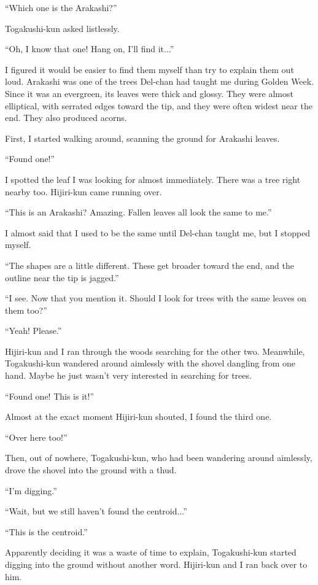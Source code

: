 \documentclass[
    a4paper,
    12pt,
    twoside,
    openany,
    UTF8,
    fontset=windows
]{ctexbook}
\begin{document}
``Which one is the Arakashi?''

Togakushi-kun asked listlessly.

``Oh, I know that one! Hang on, I'll find it...''

I figured it would be easier to find them myself than try to explain them out loud. Arakashi was one of the trees Del-chan had taught me during Golden Week. Since it was an evergreen, its leaves were thick and glossy. They were almost elliptical, with serrated edges toward the tip, and they were often widest near the end. They also produced acorns.

First, I started walking around, scanning the ground for Arakashi leaves.

``Found one!''

I spotted the leaf I was looking for almost immediately. There was a tree right nearby too. Hijiri-kun came running over.

``This is an Arakashi? Amazing. Fallen leaves all look the same to me.''

I almost said that I used to be the same until Del-chan taught me, but I stopped myself.

``The shapes are a little different. These get broader toward the end, and the outline near the tip is jagged.''

``I see. Now that you mention it. Should I look for trees with the same leaves on them too?''

``Yeah! Please.''

Hijiri-kun and I ran through the woods searching for the other two. Meanwhile, Togakushi-kun wandered around aimlessly with the shovel dangling from one hand. Maybe he just wasn't very interested in searching for trees.

``Found one! This is it!''

Almost at the exact moment Hijiri-kun shouted, I found the third one.

``Over here too!''

Then, out of nowhere, Togakushi-kun, who had been wandering around aimlessly, drove the shovel into the ground with a thud.

``I'm digging.''

``Wait, but we still haven't found the centroid...''

``This is the centroid.''

Apparently deciding it was a waste of time to explain, Togakushi-kun started digging into the ground without another word. Hijiri-kun and I ran back over to him.
\end{document}
